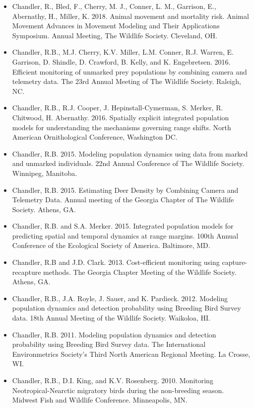 \begin{itemize}

\item Chandler, R., Bled, F., Cherry, M. J., Conner, L. M., Garrison,
  E., Abernathy, H., Miller, K. 2018. Animal movement and mortality
  risk. Animal Movement Advances in Movement Modeling and Their
  Applications Symposium. Annual Meeting, The Wildlife
  Society. Cleveland, OH. 
  
\item Chandler, R.B., M.J. Cherry, K.V. Miller, L.M. Conner,
  R.J. Warren, E. Garrison, D. Shindle, D. Crawford, B. Kelly, and K. 
  Engebretsen. 2016. Efficient monitoring of unmarked prey populations
  by combining camera and telemetry data. The 23rd Annual Meeting of
  The Wildlife Society. Raleigh, NC.

\item Chandler, R.B., R.J. Cooper, J. Hepinstall-Cymerman, S. Merker, R.
  Chitwood, H. Abernathy. 2016. Spatially explicit integrated
  population models for understanding the mechanisms governing range
  shifts. North American Ornithological Conference, Washington DC. 

\item Chandler, R.B. 2015. Modeling population dynamics using data
  from marked and unmarked individuals. 22nd Annual Conference of The
  Wildlife Society. Winnipeg, Manitoba.

\item Chandler, R.B. 2015. Estimating Deer Density by Combining Camera
  and Telemetry Data. Annual meeting of the Georgia Chapter of The
  Wildlife Society. Athens, GA.

\item Chandler, R.B. and S.A. Merker. 2015. Integrated population
  models for predicting spatial and temporal dynamics at range
  margins. 100th Annual Conference of the Ecological Society of
  America. Baltimore, MD. 

\item Chandler, R.B and J.D. Clark. 2013. Cost-efficient monitoring
  using capture-recapture methods. The Georgia Chapter Meeting of the
  Wildlife Society. Athens, GA.

\item Chandler, R.B., J.A. Royle, J. Sauer, and
  K. Pardieck. 2012. Modeling population dynamics and detection
  probability using Breeding Bird Survey data. 18th Annual Meeting of
  the Wildlife Society. Waikoloa, HI.

\item Chandler, R.B. 2011. Modeling population dynamics and detection
  probability using Breeding Bird Survey data. The International
  Environmetrics Society's Third North
  American Regional Meeting. La Crosse, WI.

\item Chandler, R.B., D.I. King, and K.V. Rosenberg. 2010. Monitoring
  Neotropical-Nearctic migratory birds during the non-breeding
  season. Midwest Fish and Wildlife Conference. Minneapolis, MN.

\end{itemize}

